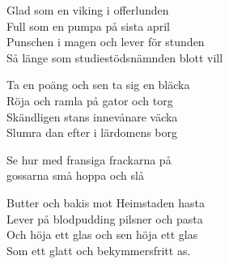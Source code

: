 \vspace{10pt}
Glad som en viking i offerlunden\\
Full som en pumpa på sista april\\
Punschen i magen och lever för stunden\\
Så länge som studiestödsnämnden blott vill\par
\vspace{10pt}
Ta en poäng och sen ta sig en bläcka\\
Röja och ramla på gator och torg\\
Skändligen stans innevånare väcka\\
Slumra dan efter i lärdomens borg\par
\vspace{10pt}
Se hur med fransiga frackarna på\\
gossarna små hoppa och slå\par
\vspace{10pt}
Butter och bakis mot Heimstaden hasta\\
Lever på blodpudding pilsner och pasta\\
Och höja ett glas och sen höja ett glas\\
Som ett glatt och bekymmersfritt as.
